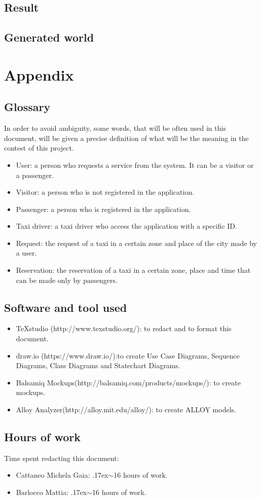 \documentclass[18pt,oneside,a4paper, titlepage]{article}
\begin{document}
	\subsection{Result}
	\subsection{Generated world}

\newpage
\section{Appendix}
	\subsection{Glossary}
		In order to avoid ambiguity, some words, that will be often used in this document, will be given a precise definition of what will be the meaning in the contest of this project.
		\begin{itemize}
			\item User: a person who requests a service from the system. It can be a visitor or a passenger.
			\item Visitor: a person who is not registered in the application.
			\item Passenger: a person who is registered in the application.
			\item Taxi driver: a taxi driver who access the application with a specific ID.
			\item Request: the request of a taxi in a certain zone and place of the city made by a user.
			\item Reservation: the reservation of a taxi in a certain zone, place and time that can be made only by passengers.
	\end{itemize}
	\subsection{Software and tool used}
		\begin{itemize}
			\item TeXstudio (http://www.texstudio.org/): to redact and to format this document.
			\item draw.io (https://www.draw.io/):to create Use Case Diagrams, Sequence Diagrams, Class Diagrams and Statechart Diagrams.
			\item Balsamiq Mockups(http://balsamiq.com/products/mockups/): to create mockups.
			\item Alloy Analyzer(http://alloy.mit.edu/alloy/): to create ALLOY models.
		\end{itemize}
	
	\subsection{Hours of work}
		Time spent redacting this document:
		\begin{itemize}
			\item Cattaneo Michela Gaia: {\raise.17ex\hbox{$\scriptstyle\sim$}}16 hours of work.
			\item Barlocco Mattia: {\raise.17ex\hbox{$\scriptstyle\sim$}}16 hours of work.
		\end{itemize}
\end{document}
